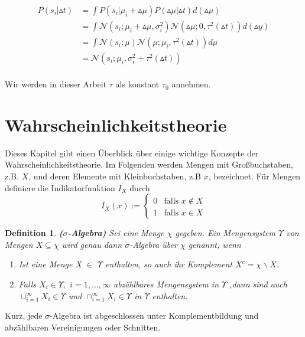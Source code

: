 \documentclass[12pt,a4paper]{scrartcl}
\newtheorem{Definition}[Satz]{Definition}
\numberwithin{equation}{section}
\begin{document}
\begin{equation}
\begin{split}
 P(s_i|\vartriangle t ) &= \int P(s_i| \mu_i + \vartriangle \mu)P(\vartriangle \mu | \vartriangle t) d(\vartriangle \mu) \\
 &= \int \mathcal{N}(s_i; \mu_i + \vartriangle \mu, \sigma_i^2)  \mathcal{N}(\vartriangle \mu; 0, \tau^2(\vartriangle t)) d(\vartriangle y) \\
 &= \int \mathcal{N}(s_i;\mu)\mathcal{N}(\mu; \mu_i, \tau^2(\vartriangle t)) d \mu \\
 &= \mathcal{N}(s_i;\mu_i,\sigma_i^2 + \tau^2(\vartriangle t)) \\
 \end{split}
\end{equation}

Wir werden in dieser Arbeit $\tau$ als konstant $\tau_0$ annehmen.
\section{Wahrscheinlichkeitstheorie}
Dieses Kapitel gibt einen Überblick über einige wichtige Konzepte der Wahrscheinlichkeitstheorie.
Im Folgenden werden Mengen mit Großbuchstaben, z.B. $X$, und deren Elemente mit Kleinbuchstaben, z.B $x$,
bezeichnet. Für Mengen definiere die Indikatorfunktion $I_{X}$ durch 
$$
I_{X}(x) := \begin{cases}0&\text{falls }x\notin X\\1&\text{falls }x \in X\end{cases}
$$

\begin{Definition}\textbf{($\sigma$-Algebra)}
 Sei eine Menge $\chi$ gegeben. Ein Mengensystem $\varUpsilon$ von Mengen $X \subseteq \chi$ wird 
 genau dann $\sigma$-Algebra über $\chi$ genannt, wenn 
 \begin{enumerate}
  \item Ist eine Menge X $\in$ $\varUpsilon$ enthalten, so auch ihr Komplement $X^{c} = \chi \backslash X$.
  \item Falls $X_{i} \in \varUpsilon,$ $i=1,...,\infty$ abzählbares Mengensystem in $\varUpsilon$
  ,dann sind auch $\cup_{i=1}^{\infty}X_{i} \in \varUpsilon$ und $\cap_{i=1}^{\infty}X_{i} \in \varUpsilon$ in 
  $\varUpsilon$ enthalten.
 \end{enumerate}

\end{Definition}

Kurz, jede $\sigma$-Algebra ist abgeschlossen unter Komplementbildung und abzählbaren Vereinigungen oder
Schnitten. 
\end{document}
